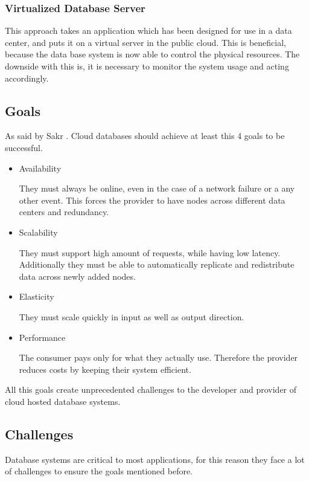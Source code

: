 \subsubsection{Virtualized Database Server \cite{zhao2013framework}}
This approach takes an application which has been designed for use in a data center, and puts it on a virtual server in the public cloud. This is beneficial, because the data base system is now able to control the physical resources. The downside with this is, it is necessary to monitor the system usage and acting accordingly.




\subsection{Goals}

As said by Sakr \cite{sakr2014cloud}. Cloud databases should achieve at least this 4 goals to be successful.
\begin{itemize}
    \item Availability
    
    They must always be online, even in the case of a network failure or a any other event. This forces the provider to have nodes across different data centers and redundancy.
    
    \item Scalability
    
    They must support high amount of requests, while having low latency. Additionally they must be able to automatically replicate and redistribute data across newly added nodes.
    
    \item Elasticity
    
    They must scale quickly in input as well as output direction.
    
    \item Performance
    
    The consumer pays only for what they actually use. Therefore the provider reduces costs by keeping their system efficient.
\end{itemize}

All this goals create unprecedented challenges to the developer and provider of cloud hosted database systems. 

\subsection{Challenges \cite{sakr2014cloud}}
Database systems are critical to most applications, for this reason they face a lot of challenges to ensure the goals mentioned before.

